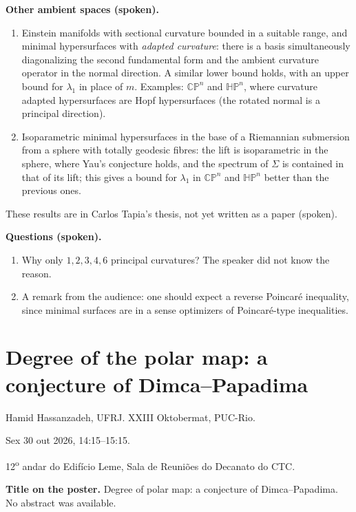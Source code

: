 \medskip\noindent
{\bf Other ambient spaces (spoken).}
\begin{enumerate}
\item Einstein manifolds with sectional
curvature bounded in a suitable range, and
minimal hypersurfaces with \emph{adapted
curvature}: there is a basis
simultaneously diagonalizing the second
fundamental form and the ambient curvature
operator in the normal direction. A
similar lower bound holds, with an upper
bound for $\lambda_1$ in place of $m$.
Examples: $\mathbb{CP}^n$ and
$\mathbb{HP}^n$, where curvature adapted
hypersurfaces are Hopf hypersurfaces (the
rotated normal is a principal direction).
\item Isoparametric minimal hypersurfaces in
the base of a Riemannian submersion from a
sphere with totally geodesic fibres: the
lift is isoparametric in the sphere, where
Yau's conjecture holds, and the spectrum of
$\Sigma$ is contained in that of its lift;
this gives a bound for $\lambda_1$ in
$\mathbb{CP}^n$ and $\mathbb{HP}^n$ better
than the previous ones.
\end{enumerate}
These results are in Carlos Tapia's thesis,
not yet written as a paper (spoken).

\medskip\noindent
{\bf Questions (spoken).}
\begin{enumerate}
\item Why only $1,2,3,4,6$ principal
curvatures? The speaker did not know the
reason.
\item A remark from the audience: one
should expect a reverse Poincar\'e
inequality, since minimal surfaces are in a
sense optimizers of Poincar\'e-type
inequalities.
\end{enumerate}

\section{Degree of the polar map: a
conjecture of Dimca--Papadima}
\label{section-degree-polar-map}

\noindent
Hamid Hassanzadeh, UFRJ.
XXIII Oktobermat, PUC-Rio.

Sex 30 out 2026, 14:15--15:15.

12\textsuperscript{o} andar do Edif\'icio
Leme, Sala de Reuni\~oes do Decanato do CTC.

\medskip\noindent
{\bf Title on the poster.} Degree of polar
map: a conjecture of Dimca--Papadima.
No abstract was available.

